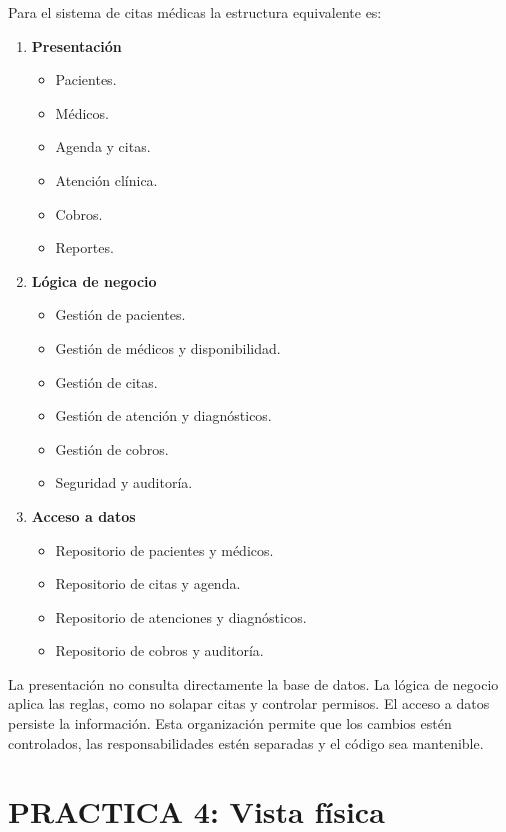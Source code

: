Para el sistema de citas médicas la estructura equivalente es:

\begin{enumerate}
    \item \textbf{Presentación}
    \begin{itemize}
        \item Pacientes.
        \item Médicos.
        \item Agenda y citas.
        \item Atención clínica.
        \item Cobros.
        \item Reportes.
    \end{itemize}
    \item \textbf{Lógica de negocio}
    \begin{itemize}
        \item Gestión de pacientes.
        \item Gestión de médicos y disponibilidad.
        \item Gestión de citas.
        \item Gestión de atención y diagnósticos.
        \item Gestión de cobros.
        \item Seguridad y auditoría.
    \end{itemize}
    \item \textbf{Acceso a datos}
    \begin{itemize}
        \item Repositorio de pacientes y médicos.
        \item Repositorio de citas y agenda.
        \item Repositorio de atenciones y diagnósticos.
        \item Repositorio de cobros y auditoría.
    \end{itemize}
\end{enumerate}

La presentación no consulta directamente la base de datos. La lógica de negocio aplica las reglas, como no solapar citas y controlar permisos. El acceso a datos persiste la información. Esta organización permite que los cambios estén controlados, las responsabilidades estén separadas y el código sea mantenible.

\section{PRACTICA 4: Vista física}

